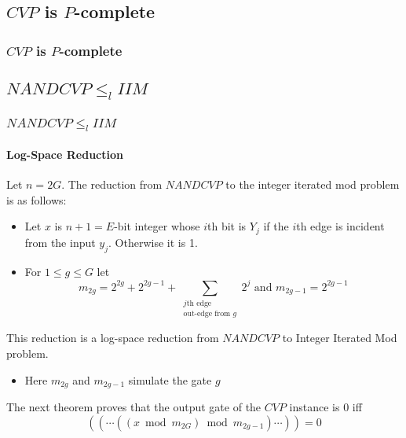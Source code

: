 \documentclass[article,8pt]{beamer}%
\begin{document}
\subsection{$CVP$ is $P$-complete}


\begin{frame}
\frametitle{$CVP$ is $P$-complete}


\end{frame}

\subsection{$NANDCVP\leq_l IIM$}

\begin{frame}

\frametitle{$NANDCVP\leq_l IIM$}
\framesubtitle{Log-Space Reduction}
Let $n=2G$. The reduction from $NANDCVP$ to the integer iterated mod problem is as follows:\begin{itemize}
	\item Let $x$ is $n+1=E$-bit integer whose $i$th bit is $Y_j$ if the $i$th edge is incident from the input $y_j$. Otherwise it is 1.
	\item For $1\leq g\leq G$ let $$m_{2g}=2^{2g}+2^{2g-1}+\sum_{\substack{j\text{th edge}\\ \text{out-edge from }g}}2^j\text{ and }m_{2g-1}=2^{2g-1}$$
\end{itemize}
This reduction is a log-space reduction from $NANDCVP$ to Integer Iterated Mod problem. 
\begin{itemize}
	\item Here $m_{2g}$ and $m_{2g-1}$ simulate the gate $g$
\end{itemize}
The next theorem proves that the output gate of the $CVP$ instance is 0 iff $$((\cdots ((x\bmod{m_{2G}})\bmod{m_{2g-1}})\cdots))=0$$
\end{frame}
\end{document}
